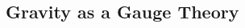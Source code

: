 \documentclass[a0,portrait]{a0poster}
\begin{document}
\begin{multicols}{2}
\section*{Gravity as a Gauge Theory}














\end{multicols}
\end{document}
